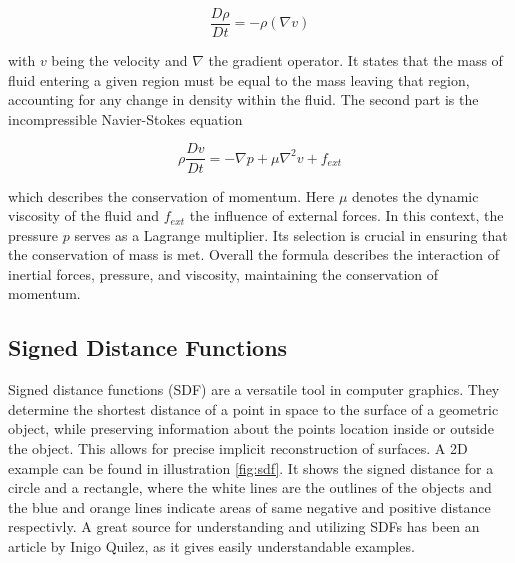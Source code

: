 \documentclass[intern]{cgMA}
\begin{document}
    \begin{equation}
        \frac{D \rho}{D t} = -\rho(\nabla v)
    \end{equation}

    with $v$ being the velocity and $\nabla$ the gradient operator. It states that the mass of fluid entering a given region must be equal to the mass leaving that region, accounting for any change in density within the fluid. The second part is the incompressible Navier-Stokes equation

    \begin{equation}
        \rho \frac{D v}{D t} = -\nabla p + \mu \nabla^2 v + f_{ext}
    \end{equation}

    which describes the conservation of momentum. Here $\mu$ denotes the dynamic viscosity of the fluid and $f_{ext}$ the influence of external forces. In this context, the pressure $p$ serves as a Lagrange multiplier. Its selection is crucial in ensuring that the conservation of mass is met. Overall the formula describes the interaction of inertial forces, pressure, and viscosity, maintaining the conservation of momentum.

    \subsection{Signed Distance Functions}
    Signed distance functions (SDF) are a versatile tool in computer graphics. They determine the shortest distance of a point in space to the surface of a geometric object, while preserving information about the points location inside or outside the object. This allows for precise implicit reconstruction of surfaces. A 2D example can be found in illustration \ref{fig:sdf}. It shows the signed distance for a circle and a rectangle, where the white lines are the outlines of the objects and the blue and orange lines indicate areas of same negative and positive distance respectivly. A great source for understanding and utilizing SDFs has been an article by Inigo Quilez, as it gives easily understandable examples. \cite{iquilezles}
\end{document}
